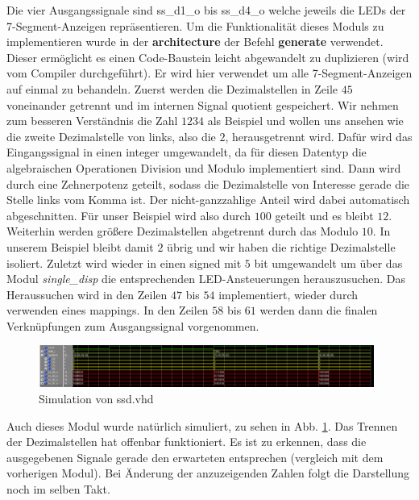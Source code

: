 

Die vier Ausgangssignale sind ss\_d1\_o bis ss\_d4\_o welche jeweils die LEDs der 7-Segment-Anzeigen repräsentieren.
Um die Funktionalität dieses Moduls zu implementieren wurde in der \textbf{architecture} der Befehl \textbf{generate} verwendet.
Dieser ermöglicht es einen Code-Baustein leicht abgewandelt zu duplizieren (wird vom Compiler durchgeführt).
Er wird hier verwendet um alle 7-Segment-Anzeigen auf einmal zu behandeln.
Zuerst werden die Dezimalstellen in Zeile $45$ voneinander getrennt und im internen Signal quotient gespeichert.
Wir nehmen zum besseren Verständnis die Zahl $1234$ als Beispiel und wollen uns ansehen wie die zweite Dezimalstelle von links, also die $2$, herausgetrennt wird.
Dafür wird das Eingangssignal in einen integer umgewandelt, da für diesen Datentyp die algebraischen Operationen Division und Modulo implementiert sind.
Dann wird durch eine Zehnerpotenz geteilt, sodass die Dezimalstelle von Interesse gerade die Stelle links vom Komma ist.
Der nicht-ganzzahlige Anteil wird dabei automatisch abgeschnitten.
Für unser Beispiel wird also durch $100$ geteilt und es bleibt $12$.
Weiterhin werden größere Dezimalstellen abgetrennt durch das Modulo $10$.
In unserem Beispiel bleibt damit $2$ übrig und wir haben die richtige Dezimalstelle isoliert.
Zuletzt wird wieder in einen signed mit $5$ bit umgewandelt um über das Modul \textit{single\_disp} die entsprechenden LED-Ansteuerungen herauszusuchen.
Das Heraussuchen wird in den Zeilen $47$ bis $54$ implementiert, wieder durch verwenden eines mappings.
In den Zeilen $58$ bis $61$ werden dann die finalen Verknüpfungen zum Ausgangssignal vorgenommen.

\begin{figure}[ht]
	\centering
    \includegraphics[width=0.98\textwidth]{../Daten/ssd.png}
	\caption{Simulation von ssd.vhd}
	\label{img_ssd}
\end{figure}

Auch dieses Modul wurde natürlich simuliert, zu sehen in Abb. \ref{img_ssd}.
Das Trennen der Dezimalstellen hat offenbar funktioniert.
Es ist zu erkennen, dass die ausgegebenen Signale gerade den erwarteten entsprechen (vergleich mit dem vorherigen Modul).
Bei Änderung der anzuzeigenden Zahlen folgt die Darstellung noch im selben Takt.

